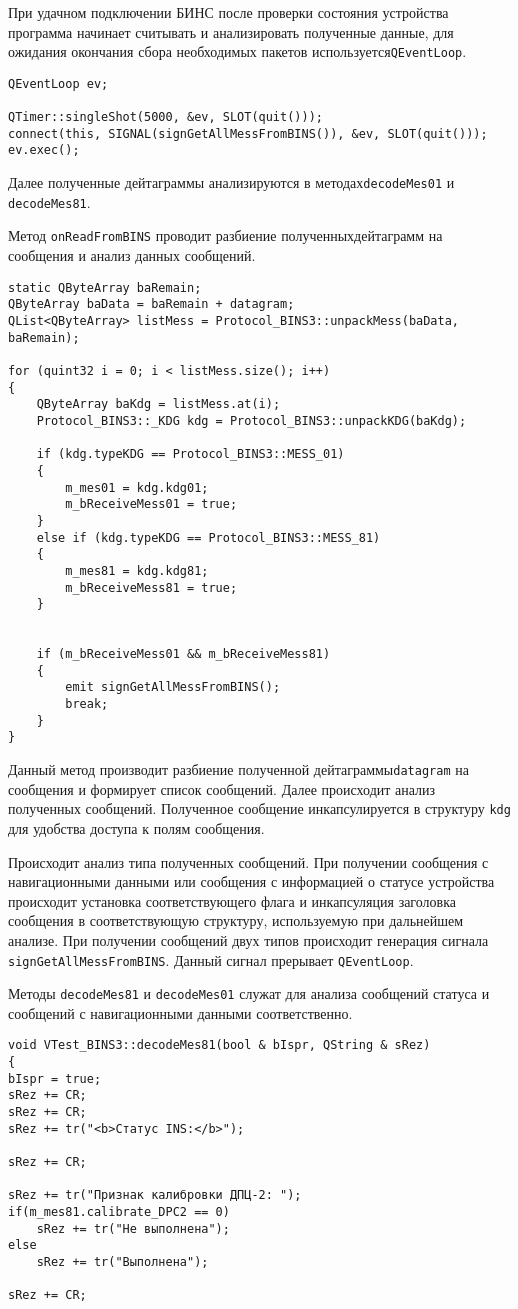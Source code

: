 При удачном подключении БИНС после проверки состояния устройства программа начинает считывать и анализировать полученные
данные, для ожидания окончания сбора необходимых пакетов используется\break \texttt{QEventLoop}.
\medskip
\begin{verbatim}
QEventLoop ev;

QTimer::singleShot(5000, &ev, SLOT(quit()));
connect(this, SIGNAL(signGetAllMessFromBINS()), &ev, SLOT(quit()));
ev.exec();
\end{verbatim}
\medskip

Далее полученные дейтаграммы анализируются в методах\break \texttt{decodeMes01} и \texttt{decodeMes81}.

Метод \texttt{onReadFromBINS} проводит разбиение полученных\break дейтаграмм на сообщения и анализ данных сообщений.
\medskip
\begin{verbatim}
static QByteArray baRemain;
QByteArray baData = baRemain + datagram;
QList<QByteArray> listMess = Protocol_BINS3::unpackMess(baData, baRemain);

for (quint32 i = 0; i < listMess.size(); i++)
{
	QByteArray baKdg = listMess.at(i);
	Protocol_BINS3::_KDG kdg = Protocol_BINS3::unpackKDG(baKdg);

	if (kdg.typeKDG == Protocol_BINS3::MESS_01)
	{
		m_mes01 = kdg.kdg01;
		m_bReceiveMess01 = true;
	}
	else if (kdg.typeKDG == Protocol_BINS3::MESS_81)
	{
		m_mes81 = kdg.kdg81;
		m_bReceiveMess81 = true;
	}


	if (m_bReceiveMess01 && m_bReceiveMess81)
	{
		emit signGetAllMessFromBINS();
		break;
	}
}
\end{verbatim}
\medskip

Данный метод производит разбиение полученной дейтаграммы\break \texttt{datagram} на сообщения и формирует список сообщений.
Далее происходит анализ полученных сообщений. Полученное сообщение инкапсулируется в структуру \texttt{kdg} для удобства
доступа к полям сообщения.

Происходит анализ типа полученных сообщений. При получении сообщения с навигационными данными или сообщения с
информацией о статусе устройства происходит установка соответствующего флага и инкапсуляция заголовка сообщения в
соответствующую структуру, используемую при дальнейшем анализе. При получении сообщений двух типов происходит генерация
сигнала \texttt{signGetAllMessFromBINS}. Данный сигнал прерывает \texttt{QEventLoop}.

Методы \texttt{decodeMes81} и \texttt{decodeMes01} служат для анализа сообщений статуса и сообщений с навигационными
данными соответственно.
\medskip
\begin{verbatim}
void VTest_BINS3::decodeMes81(bool & bIspr, QString & sRez)
{
bIspr = true;
sRez += CR;
sRez += CR;
sRez += tr("<b>Статус INS:</b>");

sRez += CR;

sRez += tr("Признак калибровки ДПЦ-2: ");
if(m_mes81.calibrate_DPC2 == 0)
	sRez += tr("Не выполнена");
else
	sRez += tr("Выполнена");

sRez += CR;
\end{verbatim}
\medskip

